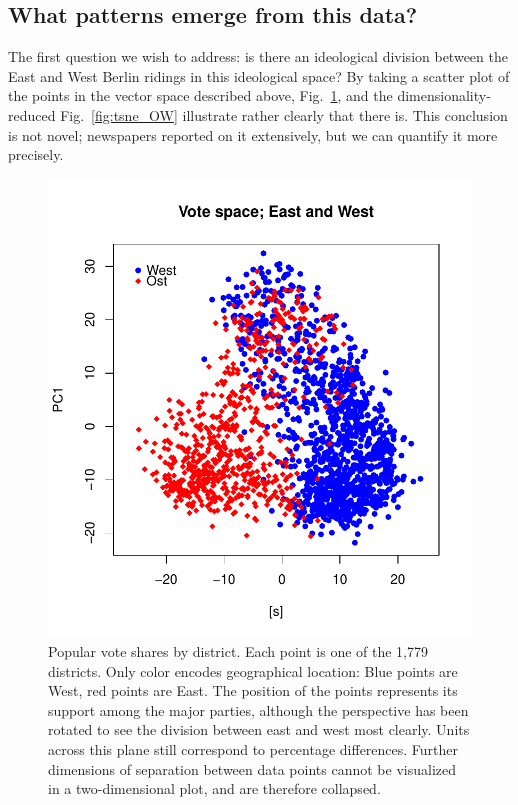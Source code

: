 \documentclass[amsmath,amssymb,nofootinbib,12pt,preprint]{revtex4}
\begin{document}

\subsection{What patterns emerge from this data?}
The first question we wish to address: is there an ideological division between the East and West Berlin ridings in this ideological space? By taking a scatter plot of the points in the vector space described above, Fig.~\ref{fig:OstWest_div}, and the dimensionality-reduced Fig.~\ref{fig:tsne_OW} illustrate rather clearly that there is. This conclusion is not novel; newspapers reported on it extensively, but we can quantify it more precisely.

\begin{figure}[h]%
\includegraphics[scale=.85]{../figures/OstWest_Vote2}%
\caption{ Popular vote shares by district. Each point is one of the 1,779 districts. Only color encodes geographical location: Blue points are West, red points are East. The position of the points represents  its support among the major parties, although the perspective has been rotated to see the division between east and west most clearly. Units across this plane still correspond to percentage differences.
Further dimensions of separation between data points cannot be visualized in a two-dimensional plot, and are therefore collapsed.}
\label{fig:OstWest_div}%
\end{figure}
\end{document}
